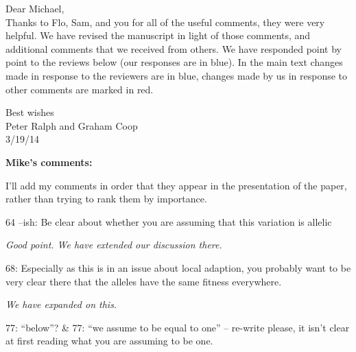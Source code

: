 \documentclass[12pt,letterpaper]{article}
\newcommand{\response}[1]{\emph{ \color{blue} #1}}
\begin{document}
Dear Michael,\\
Thanks to Flo, Sam, and you for all of the useful comments, they were very helpful. We have revised the manuscript in light of those comments, and additional comments that we received from others. We have responded point by point to the reviews below (our responses are in blue). In the main text changes made in response to the reviewers are in blue, changes made by us in response to other comments are marked in red.

 
Best wishes\\
Peter Ralph and Graham Coop\\
3/19/14
\newpage 









{\bf Mike’s comments:}

I’ll add my comments in order that they appear in the presentation of the paper, rather than trying to rank them by importance.

64 –ish: Be clear about whether you are assuming that this variation is allelic

\response{Good point. We have extended our discussion there. }


68: Especially as this is in an issue about local adaption, you probably want to be very clear there that the alleles have the same fitness everywhere.

\response{We have expanded on this.}

77: “below”? \& 77: “we assume to be equal to one” – re-write please, it isn't clear at first reading what you are assuming to be one.
\end{document}
